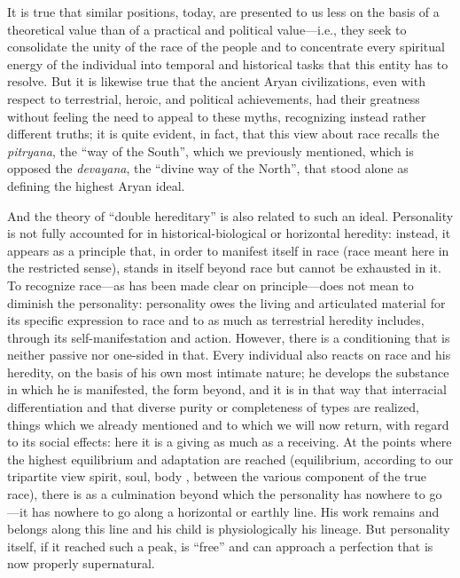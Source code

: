It is true that similar positions, today, are presented to us less on the basis of a theoretical value than of a practical and political value---i.e., they seek to consolidate the unity of the race of the people and to concentrate every spiritual energy of the individual into temporal and historical tasks that this entity has to resolve. But it is likewise true that the ancient Aryan civilizations, even with respect to terrestrial, heroic, and political achievements, had their greatness without feeling the need to appeal to these myths, recognizing instead rather different truths; it is quite evident, in fact, that this view about race recalls the \emph{pitryana}, the ``way of the South'', which we previously mentioned, which is opposed the \emph{devayana}, the ``divine way of the North'', that stood alone as defining the highest Aryan ideal.

And the theory of ``double hereditary'' is also related to such an ideal. Personality is not fully accounted for in historical-biological or horizontal heredity: instead, it appears as a principle that, in order to manifest itself in race (race meant here in the restricted sense), stands in itself beyond race but cannot be exhausted in it. To recognize race---as has been made clear on principle---does not mean to diminish the personality: personality owes the living and articulated material for its specific expression to race and to as much as terrestrial heredity includes, through its self-manifestation and action. However, there is a conditioning that is neither passive nor one-sided in that. Every individual also reacts on race and his heredity, on the basis of his own most intimate nature; he develops the substance in which he is manifested, the form beyond, and it is in that way that interracial differentiation and that diverse purity or completeness of types are realized, things which we already mentioned and to which we will now return, with regard to its social effects: here it is a giving as much as a receiving. At the points where the highest equilibrium and adaptation are reached (equilibrium, according to our tripartite view spirit, soul, body , between the various component of the true race), there is as a culmination beyond which the personality has nowhere to go---it has nowhere to go along a horizontal or earthly line. His work remains and belongs along this line and his child is physiologically his lineage. But personality itself, if it reached such a peak, is ``free'' and can approach a perfection that is now properly supernatural.

